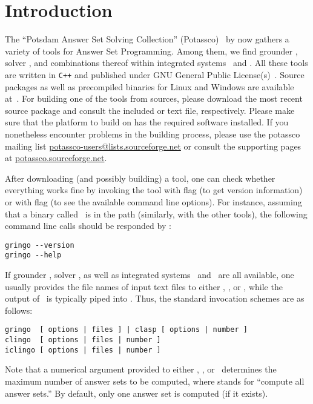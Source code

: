 \section{Introduction}\label{sec:introduction}

The ``Potsdam Answer Set Solving Collection'' (Potassco)~\cite{potassco}
by now gathers a variety of tools for Answer Set Programming.
Among them, we find grounder \gringo, solver \clasp, and
combinations thereof within integrated systems \clingo\ and \iclingo.
All these tools are written in \texttt{C++} and published under GNU General Public License(s)~\cite{GNUgpl}.
Source packages as well as precompiled binaries for Linux and Windows are available at~\cite{potassco}.
For building one of the tools from sources,
please download the most recent source package and consult the
included  or  text file, respectively.
Please make sure that the platform to build on has the
required software installed.
If you nonetheless encounter problems in the building process,
please use the potassco mailing list 
\href{mailto:potassco-users@lists.sourceforge.net}{potassco-users@lists.sourceforge.net}
or consult the supporting pages at \href{http://potassco.sourceforge.net}{potassco.sourceforge.net}.

After downloading (and possibly building) a tool,
one can check whether everything works fine by invoking the tool
with flag  (to get version information) or
with flag  (to see the available command line options).
For instance, assuming that a binary called \gringo\ is in the path
(similarly, with the other tools),
the following command line calls should be responded by \gringo:
%
\begin{lstlisting}[numbers=none]
gringo --version
gringo --help
\end{lstlisting}
If grounder \gringo, solver \clasp, as well as integrated systems
\clingo\ and \iclingo\ are all available,
one usually provides the file names of input text files to either
\gringo, \clingo, or \iclingo, while the output of \gringo\ is
typically piped into \clasp.
Thus, the standard invocation schemes are as follows:
\begin{lstlisting}[numbers=none]
gringo  [ options | files ] | clasp [ options | number ]
clingo  [ options | files | number ]
iclingo [ options | files | number ]
\end{lstlisting}
Note that a numerical argument provided to either \clasp, \clingo, or \iclingo\
determines the maximum number of answer sets to be computed,
where  stands for ``compute all answer sets.''
By default, only one answer set is computed (if it exists).

